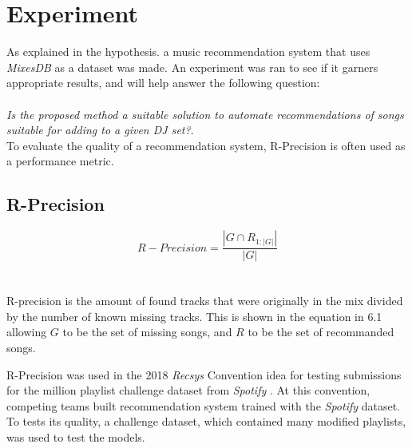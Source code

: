 
\graphicspath{{Chapter5/}}


\chapter{Experiment}


As explained in the hypothesis. a music recommendation system that uses \textit{MixesDB} as a dataset was made. An experiment was ran to see if it garners appropriate results, and will help answer the following question:
\\
\\
\textit{Is the proposed method a suitable solution to automate recommendations of songs suitable for adding to a given DJ set?}.
\\

To evaluate the quality of a recommendation system, R-Precision is often used as a performance metric. 
\\

\section{R-Precision}

\begin{equation}
	R-Precision = \frac{|G\cap R_{1:|G|}|}{|G|}
\end{equation}
\\\\
R-precision is the amount of found tracks that were originally in the mix divided by the number of known missing tracks. This is shown in the equation in 6.1 allowing $G$ to be the set of missing songs, and $R$ to be the set of recommanded songs.

R-Precision was used in the 2018 \textit{Recsys} Convention idea for testing submissions for the million playlist challenge dataset from \textit{Spotify} \citep{aicrowd_aicrowd_2023}. At this convention, competing teams built recommendation system trained with the \textit{Spotify} dataset. To tests its quality, a challenge dataset, which contained many modified playlists, was used to test the models.

